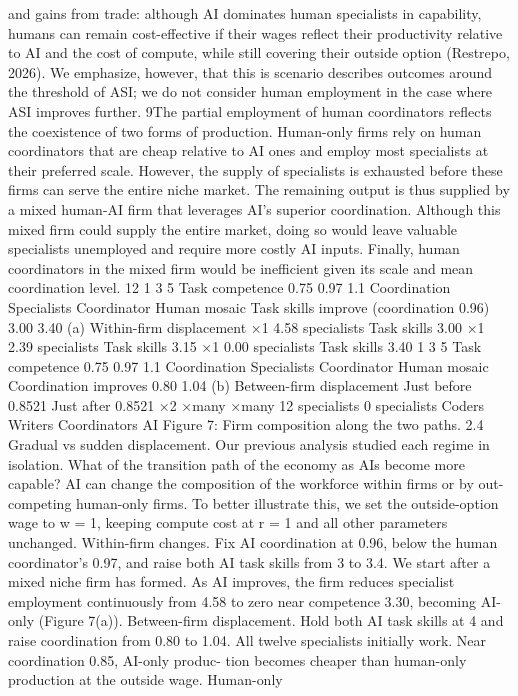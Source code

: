 and gains from trade: although AI dominates human specialists in capability, humans
can remain cost-effective if their wages reflect their productivity relative to AI and
the cost of compute, while still covering their outside option (Restrepo, 2026). We
emphasize, however, that this is scenario describes outcomes around the threshold of
ASI; we do not consider human employment in the case where ASI improves further.
9The partial employment of human coordinators reflects the coexistence of two forms of production.
Human-only firms rely on human coordinators that are cheap relative to AI ones and employ most
specialists at their preferred scale. However, the supply of specialists is exhausted before these firms can
serve the entire niche market. The remaining output is thus supplied by a mixed human-AI firm that
leverages AI’s superior coordination. Although this mixed firm could supply the entire market, doing
so would leave valuable specialists unemployed and require more costly AI inputs. Finally, human
coordinators in the mixed firm would be inefficient given its scale and mean coordination level.
12
1
3
5
Task competence
0.75
0.97
1.1
Coordination
Specialists
Coordinator
Human
mosaic
Task skills improve
(coordination 0.96)
3.00
3.40
(a) Within-ﬁrm displacement
×1
4.58 specialists
Task skills 3.00
×1
2.39 specialists
Task skills 3.15
×1
0.00 specialists
Task skills 3.40
1
3
5
Task competence
0.75
0.97
1.1
Coordination
Specialists
Coordinator
Human
mosaic
Coordination improves
0.80
1.04
(b) Between-ﬁrm displacement
Just before 0.8521
Just after 0.8521
×2
×many
×many
12 specialists
0 specialists
Coders
Writers
Coordinators
AI
Figure 7: Firm composition along the two paths.
2.4 Gradual vs sudden displacement. Our previous analysis studied each regime in
isolation. What of the transition path of the economy as AIs become more capable?
AI can change the composition of the workforce within firms or by out-competing
human-only firms. To better illustrate this, we set the outside-option wage to w = 1,
keeping compute cost at r = 1 and all other parameters unchanged.
Within-firm changes. Fix AI coordination at 0.96, below the human coordinator’s 0.97,
and raise both AI task skills from 3 to 3.4. We start after a mixed niche firm has formed.
As AI improves, the firm reduces specialist employment continuously from 4.58 to
zero near competence 3.30, becoming AI-only (Figure 7(a)).
Between-firm displacement. Hold both AI task skills at 4 and raise coordination from 0.80
to 1.04. All twelve specialists initially work. Near coordination 0.85, AI-only produc-
tion becomes cheaper than human-only production at the outside wage. Human-only
